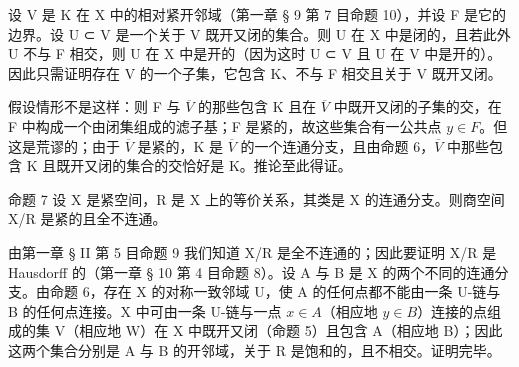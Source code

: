 设 V 是 K 在 X 中的相对紧开邻域（第一章 § 9 第 7 目命题 10），并设 F 是它的边界。设 U ⊂ V 是一个关于 V 既开又闭的集合。则 U 在 X 中是闭的，且若此外 U 不与 F 相交，则 U 在 X 中是开的（因为这时 U ⊂ V 且 U 在 V 中是开的）。因此只需证明存在 V 的一个子集，它包含 K、不与 F 相交且关于 V 既开又闭。

假设情形不是这样：则 F 与 \(\overline{V}\) 的那些包含 K 且在 \(\overline{V}\) 中既开又闭的子集的交，在 F 中构成一个由闭集组成的滤子基；F 是紧的，故这些集合有一公共点 \(y \in F\)。但这是荒谬的；由于 \(\overline{V}\) 是紧的，K 是 \(\overline{V}\) 的一个连通分支，且由命题 6，\(\overline{V}\) 中那些包含 K 且既开又闭的集合的交恰好是 K。推论至此得证。

命题 7 设 X 是紧空间，R 是 X 上的等价关系，其类是 X 的连通分支。则商空间 X/R 是紧的且全不连通。

由第一章 § II 第 5 目命题 9 我们知道 X/R 是全不连通的；因此要证明 X/R 是 Hausdorff 的（第一章 § 10 第 4 目命题 8）。设 A 与 B 是 X 的两个不同的连通分支。由命题 6，存在 X 的对称一致邻域 U，使 A 的任何点都不能由一条 U-链与 B 的任何点连接。X 中可由一条 U-链与一点 \(x \in A\)（相应地 \(y \in B\)）连接的点组成的集 V（相应地 W）在 X 中既开又闭（命题 5）且包含 A（相应地 B）；因此这两个集合分别是 A 与 B 的开邻域，关于 R 是饱和的，且不相交。证明完毕。

